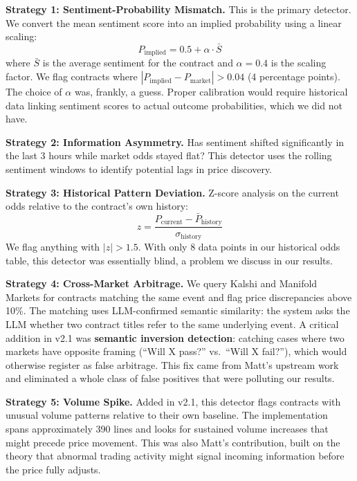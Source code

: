 \documentclass[conference]{IEEEtran}
\begin{document}
\textbf{Strategy 1: Sentiment-Probability Mismatch.}
This is the primary detector. We convert the mean sentiment score into an implied probability using a linear scaling:
\begin{equation}
P_{\text{implied}} = 0.5 + \alpha \cdot \bar{S}
\end{equation}
where $\bar{S}$ is the average sentiment for the contract and $\alpha = 0.4$ is the scaling factor. We flag contracts where $|P_{\text{implied}} - P_{\text{market}}| > 0.04$ (4 percentage points). The choice of $\alpha$ was, frankly, a guess. Proper calibration would require historical data linking sentiment scores to actual outcome probabilities, which we did not have.

\textbf{Strategy 2: Information Asymmetry.}
Has sentiment shifted significantly in the last 3 hours while market odds stayed flat? This detector uses the rolling sentiment windows to identify potential lags in price discovery.

\textbf{Strategy 3: Historical Pattern Deviation.}
Z-score analysis on the current odds relative to the contract's own history:
\begin{equation}
z = \frac{P_{\text{current}} - \bar{P}_{\text{history}}}{\sigma_{\text{history}}}
\end{equation}
We flag anything with $|z| > 1.5$. With only 8 data points in our historical odds table, this detector was essentially blind, a problem we discuss in our results.

\textbf{Strategy 4: Cross-Market Arbitrage.}
We query Kalshi and Manifold Markets for contracts matching the same event and flag price discrepancies above 10\%. The matching uses LLM-confirmed semantic similarity: the system asks the LLM whether two contract titles refer to the same underlying event. A critical addition in v2.1 was \textbf{semantic inversion detection}: catching cases where two markets have opposite framing (``Will X pass?'' vs.\ ``Will X fail?''), which would otherwise register as false arbitrage. This fix came from Matt's upstream work and eliminated a whole class of false positives that were polluting our results.

\textbf{Strategy 5: Volume Spike.}
Added in v2.1, this detector flags contracts with unusual volume patterns relative to their own baseline. The implementation spans approximately 390 lines and looks for sustained volume increases that might precede price movement. This was also Matt's contribution, built on the theory that abnormal trading activity might signal incoming information before the price fully adjusts.
\end{document}
